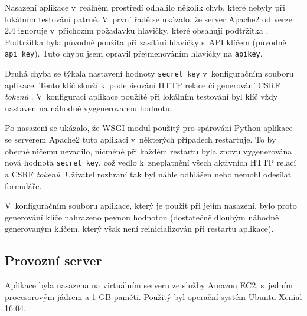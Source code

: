 Nasazení aplikace v~reálném prostředí odhalilo několik chyb, které nebyly při lokálním testování patrné. V~první řadě se ukázalo, že server Apache2 od verze 2.4 ignoruje v~příchozím požadavku hlavičky, které obsahují podtržítka \cite{apache_headers_update}. Podtržítka byla původně použita při zasílání hlavičky s~API klíčem (původně \texttt{api\_key}). Tuto chybu jsem opravil přejmenováním hlavičky na \texttt{apikey}.

Druhá chyba se týkala nastavení hodnoty \texttt{secret\_key} v~konfiguračním souboru aplikace. Tento klíč slouží k~podepisování HTTP relace či generování CSRF \textit{tokenů} \cite{flask_api}. V~konfiguraci aplikace použité při lokálním testování byl klíč vždy nastaven na náhodně vygenerovanou hodnotu.

Po nasazení se ukázalo, že WSGI \cite{python_wsgi} modul použitý pro spárování Python aplikace se serverem Apache2 tuto aplikaci v~některých případech restartuje. To by obecně ničemu nevadilo, nicméně při každém restartu byla znovu vygenerována nová hodnota \texttt{secret\_key}, což vedlo k~zneplatnění všech aktivních HTTP relací a CSRF \textit{tokenů}. Uživatel rozhraní tak byl náhle odhlášen nebo nemohl odesílat formuláře. 

V~konfiguračním souboru aplikace, který je použit při jejím nasazení, bylo proto generování klíče nahrazeno pevnou hodnotou (dostatečně dlouhým náhodně generovaným klíčem, který však není reinicializován při restartu aplikace).



\subsection{Provozní server}

Aplikace byla nasazena na virtuálním serveru ze služby Amazon EC2, s~jedním procesorovým jádrem a 1 GB paměti. Použitý byl operační systém Ubuntu Xenial 16.04.

